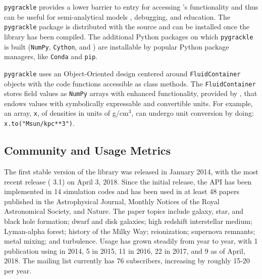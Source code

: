 \texttt{pygrackle} provides a lower barrier to
entry for accessing \grackle{}'s functionality and thus can be
useful for semi-analytical models \citep[e.g.,][]{2016ApJ...820...71C,
2016MNRAS.459.4209A}, debugging, and education.  The
\texttt{pygrackle} package is distributed with the \grackle{} source
and can be installed once the library has been compiled.  The
additional Python packages on which \texttt{pygrackle} is built
(\texttt{NumPy}, \texttt{Cython}, and \yt{}) are
installable by popular Python package managers, like \texttt{Conda}
and \texttt{pip}.

\texttt{pygrackle} uses an Object-Oriented design centered around
\texttt{FluidContainer} objects with the code \grackle{} functions
accessible as class methods. The \texttt{FluidContainer} stores field
values as \texttt{NumPy} arrays with enhanced functionality, provided
by \yt{}, that endows values with symbolically expressable and
convertible units.  For example, an array, \texttt{x}, of densities in units of
g/cm$^{3}$, can undergo unit conversion by doing:
\texttt{x.to("Msun/kpc**3")}.

\subsection{Community and Usage Metrics}

The first stable version of the \grackle{} library was released in
January 2014, with the most recent release (\grackle{} 3.1) on April
3, 2018.  Since the initial release, the \grackle{} API has been
implemented in 14 simulation codes and has been used in at least 48 papers
published in the Astrophysical Journal, Monthly Notices of the Royal
Astronomical Society, and Nature.  The paper topics include galaxy,
star, and black hole formation; dwarf
and disk galaxies; high redshift interstellar medium; Lyman-alpha
forest; history of the Milky Way; reionization; supernova
remnants; metal mixing; and turbulence.  Usage has grown steadily
from year to year, with 1 publication using \grackle{} in 2014, 5 in
2015, 11 in 2016, 22 in 2017, and 9 as of April, 2018.  The
\grackle{} mailing list currently has 76 subscribers, increasing by
roughly 15-20 per year.

